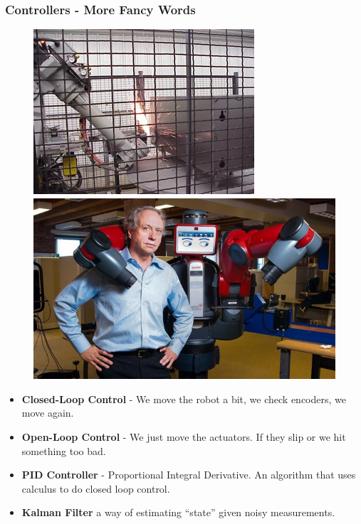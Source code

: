 \documentclass[compress]{beamer}
\begin{document}
\begin{frame}
  \frametitle{Controllers - More Fancy Words}
  \begin{figure}
     \includegraphics[width=0.4\linewidth]{caged.jpg}
     \quad
     \includegraphics[width=0.4\linewidth]{rethink.jpg}
  \end{figure}
   \begin{itemize}
   \item \textbf{Closed-Loop Control} - We move the robot a bit, we check encoders, we move again. 
   \item \textbf{Open-Loop Control} - We just move the actuators. If they slip or we hit something too bad. 
   \item \textbf{PID Controller}  - Proportional Integral Derivative. An algorithm that uses calculus to do closed loop control. 
    \item \textbf{Kalman Filter} a way of estimating ``state'' given noisy measurements. 
   \end{itemize}     
 \end{frame}
\end{document}
